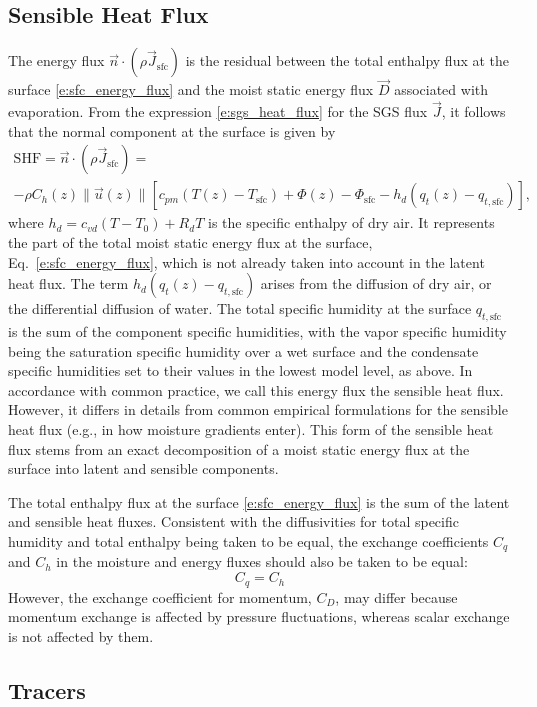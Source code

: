 \documentclass{report}
\begin{document}
\subsection{Sensible Heat Flux} The energy flux $\vec{n} \cdot (\rho \vec{J}_{\mathrm{sfc}})$ is the residual between the total enthalpy flux at the surface \eqref{e:sfc_energy_flux} and the moist static energy flux $\vec{D}$ associated with evaporation. From the expression \eqref{e:sgs_heat_flux} for the SGS flux $\vec{J}$, it follows that the normal component at the surface is given by 
\begin{multline}\label{e:sfc_SHF}
    \mathrm{SHF} = \vec{n} \cdot (\rho \vec{J}_{\mathrm{sfc}}) =
    \\ -\rho C_h(z) \| \vec{u}(z) \| \left[ c_{pm} (T(z) - T_\mathrm{sfc}) + \Phi(z) - \Phi_\mathrm{sfc}
    - h_d (q_t(z) - q_{t, \mathrm{sfc}})  \right],
\end{multline}
where $h_d = c_{vd} (T - T_0) + R_d T$ is the specific enthalpy of dry air. It represents the part of the total moist static energy flux at the surface, Eq.~\eqref{e:sfc_energy_flux}, which is not already taken into account in the latent heat flux. The term $h_d (q_t(z) - q_{t, \mathrm{sfc}})$ arises from the diffusion of dry air, or the differential diffusion of water. The total specific humidity at the surface $q_{t, \mathrm{sfc}}$ is the sum of the component specific humidities, with the vapor specific humidity being the saturation specific humidity over a wet surface and the condensate specific humidities set to their values in the lowest model level, as above. In accordance with common practice, we call this energy flux the sensible heat flux. However, it differs in details from common empirical formulations for the sensible heat flux (e.g., in how moisture gradients enter). This form of the sensible heat flux stems from an exact decomposition of a moist static energy flux at the surface into latent and sensible components. 

The total enthalpy flux at the surface \eqref{e:sfc_energy_flux} is the sum of the latent and sensible heat fluxes. Consistent with the diffusivities for total specific humidity and total enthalpy being taken to be equal, the exchange coefficients $C_q$ and $C_h$ in the moisture and energy fluxes should also be taken to be equal:
\[
C_q = C_h
\]
However, the exchange coefficient for momentum, $C_D$, may differ because momentum exchange is affected by pressure fluctuations, whereas scalar exchange is not affected by them.

\subsection{Tracers}
\end{document}
